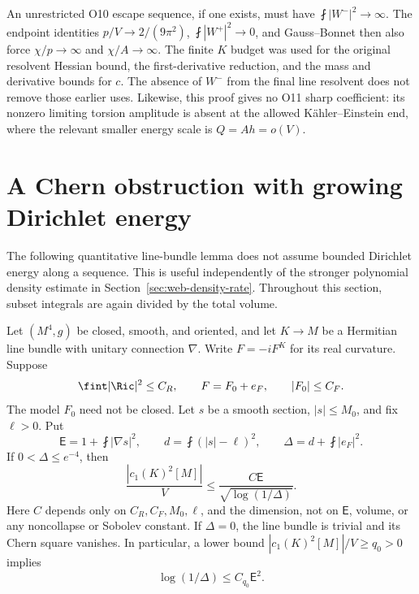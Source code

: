 \begin{remark}
An unrestricted O10 escape sequence, if one exists, must have
\(\fint|W^-|^2\to\infty\).  The endpoint identities
\(p/V\to2/(9\pi^2)\), \(\fint|W^+|^2\to0\), and Gauss--Bonnet
then also force \(\chi/p\to\infty\) and \(\chi/A\to\infty\).
The finite \(K\) budget was used for the original resolvent Hessian bound,
the first-derivative reduction, and the mass and derivative bounds for \(c\).
The absence of \(W^-\) from the final line resolvent does not remove those
earlier uses.  Likewise, this proof gives no O11 sharp coefficient: its
nonzero limiting torsion amplitude is absent at the allowed K\"ahler--Einstein
end, where the relevant smaller energy scale is \(Q=Ah=o(V)\).
\end{remark}

\section{A Chern obstruction with growing Dirichlet energy}
\label{sec:web-growing-energy-chern}

The following quantitative line-bundle lemma does not assume bounded
Dirichlet energy along a sequence.  This is useful independently of the
stronger polynomial density estimate in Section~\ref{sec:web-density-rate}.
Throughout this section, subset integrals are again divided by the total
volume.

\begin{proposition}
\label{prop:web-gec-lemma}
Let \((M^4,g)\) be closed, smooth, and oriented, and let \(K\to M\)
be a Hermitian line bundle with unitary connection \(\nabla\).  Write
\(F=-iF^K\) for its real curvature.  Suppose
\[
 \fint|\Ric|^2\le C_R,\qquad F=F_0+e_F,
 \qquad |F_0|\le C_F.
\]
The model \(F_0\) need not be closed.  Let \(s\) be a smooth section,
\(|s|\le M_0\), and fix \(\ell>0\).  Put
\[
 \mathsf E=1+\fint|\nabla s|^2,\qquad
 d=\fint(|s|-\ell)^2,\qquad
 \Delta=d+\fint|e_F|^2.
\]
If \(0<\Delta\le e^{-4}\), then
\begin{equation}
 \frac{|c_1(K)^2[M]|}{V}
 \le\frac{C\mathsf E}{\sqrt{\log(1/\Delta)}}.
 \label{eq:web-gec-logarithmic-bound}
\end{equation}
Here \(C\) depends only on \(C_R,C_F,M_0,\ell\), and the dimension,
not on \(\mathsf E\), volume, or any noncollapse or Sobolev constant.
If \(\Delta=0\), the line bundle is trivial and its Chern square vanishes.
In particular, a lower bound \(|c_1(K)^2[M]|/V\ge q_0>0\) implies
\begin{equation}
 \log(1/\Delta)\le C_{q_0}\mathsf E^2.
 \label{eq:web-gec-logarithmic-lower-bound}
\end{equation}
\end{proposition}

